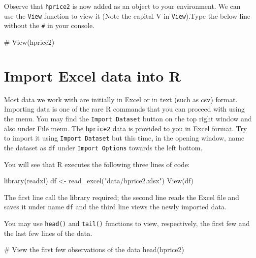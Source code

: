 \documentclass[
  letterpaper,
  DIV=11,
  numbers=noendperiod]{scrreprt}
\newenvironment{Shaded}{\begin{snugshade}}{\end{snugshade}}
\newcommand{\CommentTok}[1]{\textcolor[rgb]{0.37,0.37,0.37}{#1}}
\newcommand{\FunctionTok}[1]{\textcolor[rgb]{0.28,0.35,0.67}{#1}}
\newcommand{\NormalTok}[1]{\textcolor[rgb]{0.00,0.23,0.31}{#1}}
\newcommand{\OtherTok}[1]{\textcolor[rgb]{0.00,0.23,0.31}{#1}}
\newcommand{\StringTok}[1]{\textcolor[rgb]{0.13,0.47,0.30}{#1}}
\begin{document}
Observe that \texttt{hprice2} is now added as an object to your
environment. We can use the \texttt{View} function to view it (Note the
capital V in \texttt{View}).Type the below line without the \texttt{\#}
in your console.

\begin{Shaded}
\begin{Highlighting}[]
\CommentTok{\# View(hprice2)}
\end{Highlighting}
\end{Shaded}

\section{Import Excel data into R}\label{import-excel-data-into-r}

Most data we work with are initially in Excel or in text (such as csv)
format. Importing data is one of the rare R commands that you can
proceed with using the menu. You may find the \texttt{Import\ Dataset}
button on the top right window and also under File menu. The
\texttt{hprice2} data is provided to you in Excel format. Try to import
it using \texttt{Import\ Dataset} but this time, in the opening window,
name the dataset as \texttt{df} under \texttt{Import\ Options} towards
the left bottom.

You will see that R executes the following three lines of code:

\begin{Shaded}
\begin{Highlighting}[]
\FunctionTok{library}\NormalTok{(readxl)}
\NormalTok{df }\OtherTok{\textless{}{-}} \FunctionTok{read\_excel}\NormalTok{(}\StringTok{"data/hprice2.xlsx"}\NormalTok{)}
\FunctionTok{View}\NormalTok{(df)}
\end{Highlighting}
\end{Shaded}

The first line call the library required; the second line reads the
Excel file and saves it under name \texttt{df} and the third line views
the newly imported data.

You may use \texttt{head()} and \texttt{tail()} functions to view,
respectively, the first few and the last few lines of the data.

\begin{Shaded}
\begin{Highlighting}[]
\CommentTok{\# View the first few observations of the data}
\FunctionTok{head}\NormalTok{(hprice2)}
\end{Highlighting}
\end{Shaded}
\end{document}
